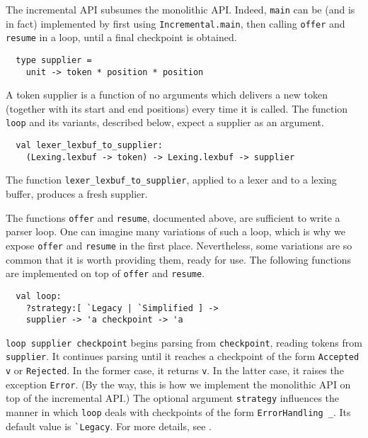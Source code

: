 \documentclass[onecolumn,11pt,nocopyrightspace,preprint]{sigplanconf}
\begin{document}
The incremental API subsumes the monolithic API. Indeed, \verb+main+ can be
(and is in fact) implemented by first using
\verb+Incremental.main+, then calling \verb+offer+ and
\verb+resume+ in a loop, until a final checkpoint is obtained.


\begin{verbatim}
  type supplier =
    unit -> token * position * position
\end{verbatim}

A token supplier is a function of no arguments which delivers a new token
(together with its start and end positions) every time it is called. The
function \verb+loop+ and its variants, described below, expect a supplier
as an argument.


\begin{verbatim}
  val lexer_lexbuf_to_supplier:
    (Lexing.lexbuf -> token) -> Lexing.lexbuf -> supplier
\end{verbatim}

The function \verb+lexer_lexbuf_to_supplier+, applied to a lexer and to a
lexing buffer, produces a fresh supplier.


The functions \verb+offer+ and \verb+resume+, documented above, are sufficient
to write a parser loop. One can imagine many variations of such a loop, which
is why we expose \verb+offer+ and \verb+resume+ in the first place.
Nevertheless, some variations are so common that it is worth providing them,
ready for use. The following functions are implemented on top of \verb+offer+
and \verb+resume+.


\begin{verbatim}
  val loop:
    ?strategy:[ `Legacy | `Simplified ] ->
    supplier -> 'a checkpoint -> 'a
\end{verbatim}

\verb+loop supplier checkpoint+ begins parsing from \verb+checkpoint+, reading
tokens from \verb+supplier+. It continues parsing until it reaches a
checkpoint of the form \verb+Accepted v+ or \verb+Rejected+. In the former
case, it returns \verb+v+. In the latter case, it raises the
exception \verb+Error+. (By the way, this is how we implement the monolithic
API on top of the incremental API.)
%
The optional argument \verb+strategy+ influences the manner in which
\verb+loop+ deals with checkpoints of the form \verb+ErrorHandling _+. Its
default value is \verb+`Legacy+. For more details, see .
\end{document}
